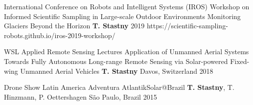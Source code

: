 \label{sec:talks}

\begin{cventries}

\cvtalkentry
	{International Conference on Robots and Intelligent Systems (IROS)} %
	{Workshop on Informed Scientific Sampling in Large-scale Outdoor Environments} %
	{Monitoring Glaciers Beyond the Horizon} %
	{\textbf{T. Stastny}} %
	{} %
	{2019} %
	{https://scientific-sampling-robots.github.io/iros-2019-workshop/} %
	
\cvtalkentry
	{WSL Applied Remote Sensing Lectures} %
	{Application of Unmanned Aerial Systems} %
	{Towards Fully Autonomous Long-range Remote Sensing via Solar-powered Fixed-wing Unmanned Aerial Vehicles} %
	{\textbf{T. Stastny}} %
	{Davos, Switzerland} %
	{2018} %
	{} %
	
\vspace*{-9pt}
\cvtalkentry
	{Drone Show Latin America} %
	{} %
	{Adventura AtlantikSolar@Brazil} %
	{\textbf{T. Stastny}, T. Hinzmann, P. Oettershagen} %
	{S\~{a}o Paulo, Brazil} %
	{2015} %
	{} %

\end{cventries}
